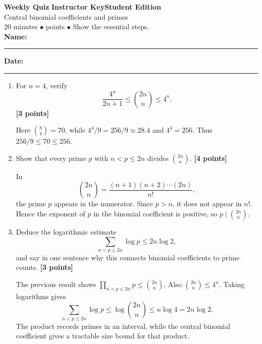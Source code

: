\documentclass[11pt]{article}
\newcounter{quiznum}
\newcommand{\edition}{\ifanswers Instructor Key\else Student Edition\fi}
\newcommand{\points}[1]{\hfill{\small\color{coral}\textbf{[#1 points]}}}
\newcommand{\quizheading}[1]{%
  \clearpage\stepcounter{quiznum}%
  \begin{tcolorbox}[
    enhanced,colback=paper,colframe=navy,boxrule=1.1pt,arc=2mm,
    left=4mm,right=4mm,top=2.5mm,bottom=2.5mm,
    borderline west={4pt}{0pt}{teal}]
    {\Large\bfseries\color{navy}Weekly Quiz \thequiznum}\hfill
    {\bfseries\color{teal}\edition}\\[-1pt]
    {\large\color{ink}#1}\\[2pt]
    {\small\color{muted}20 minutes \quad $\bullet$ \quad 10 points \quad $\bullet$ \quad Show the essential steps.}
    \ifanswers\else
      \\[5pt]\textbf{Name:}\ \rule{0.48\linewidth}{0.4pt}\hfill
      \textbf{Date:}\ \rule{0.20\linewidth}{0.4pt}
    \fi
  \end{tcolorbox}
}
\begin{document}
\quizheading{Central binomial coefficients and primes}
\begin{enumerate}
  \item For $n=4$, verify
  \[
    \frac{4^n}{2n+1}\le \binom{2n}{n}\le4^n.
  \]
  \points{3}
  \begin{solution}[1.15in]
    Here $\binom84=70$, while $4^4/9=256/9\approx28.4$ and $4^4=256$.
    Thus $256/9\le70\le256$.
  \end{solution}

  \item Show that every prime $p$ with $n<p\le2n$ divides $\binom{2n}{n}$.
  \points{4}
  \begin{solution}[1.45in]
    In
    \[
      \binom{2n}{n}=\frac{(n+1)(n+2)\cdots(2n)}{n!},
    \]
    the prime $p$ appears in the numerator. Since $p>n$, it does not appear in
    $n!$. Hence the exponent of $p$ in the binomial coefficient is positive, so
    $p\mid\binom{2n}{n}$.
  \end{solution}

  \item Deduce the logarithmic estimate
  \[
    \sum_{n<p\le2n}\log p\le2n\log2,
  \]
  and say in one sentence why this connects binomial coefficients to prime counts.
  \points{3}
  \begin{solution}[1.45in]
    The previous result shows
    $\prod_{n<p\le2n}p\le\binom{2n}{n}$. Also
    $\binom{2n}{n}\le4^n$. Taking logarithms gives
    \[
      \sum_{n<p\le2n}\log p\le\log\binom{2n}{n}\le n\log4=2n\log2.
    \]
    The product records primes in an interval, while the central binomial
    coefficient gives a tractable size bound for that product.
  \end{solution}
\end{enumerate}
\end{document}
